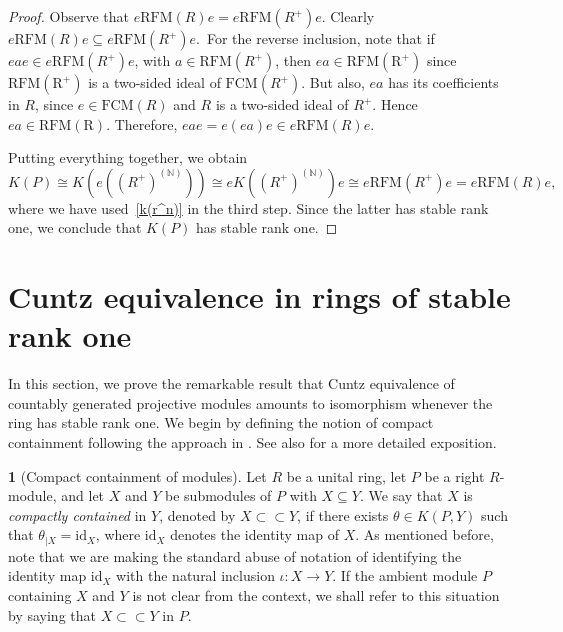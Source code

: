 \documentclass[11pt]{amsart}
\numberwithin{equation}{section}
\theoremstyle{definition}
\newtheorem{pgr}[pgrCt]{}
\newtheorem{dfn}[dfnCt]{Definition}
\theoremstyle{plain}
\theoremstyle{definition}
\begin{document}
\begin{proof}
Observe that $e\mathrm{RFM}(R)e = e\mathrm{RFM}(R^+)e$. Clearly $e\mathrm{RFM}(R)e \subseteq e\mathrm{RFM}(R^+)e$.~For the reverse inclusion, note that if $eae \in e\mathrm{RFM}(R^+)e$, with $a \in \mathrm{RFM}(R^+)$, then $ea \in \mathrm{RFM(R^+)}$ since $\mathrm{RFM(R^+)}$ is a two-sided ideal of $\mathrm{FCM}(R^+)$. But also, $ea$ has its coefficients in $R$, since $e \in \mathrm{FCM}(R)$ and $R$ is a two-sided ideal of $R^+$. Hence $ea \in \mathrm{RFM(R)}$. Therefore, $eae = e(ea)e \in e\mathrm{RFM}(R)e$. 

Putting everything together, we obtain
\begin{equation*}
    K(P) \cong K(e((R^+)^{(\mathbb{N})})) \cong eK((R^+)^{(\mathbb{N})})e \cong e\mathrm{RFM}(R^+)e = e\mathrm{RFM}(R)e,
\end{equation*}
where we have used~\autoref{k(r^n)} in the third step. Since the latter has stable rank one, we conclude that $K(P)$ has stable rank one. 
\end{proof}

\section{Cuntz equivalence in rings of stable rank one}

In this section, we prove the remarkable result that Cuntz equivalence of countably generated projective modules amounts to isomorphism whenever the ring has stable rank one. We begin by defining the notion of compact containment following the approach in \cite{CowEllIva08CuInv}. See also \cite[4.4]{AraPerTom11Cu} for a more detailed exposition.  

\begin{pgr}[Compact containment of modules]
Let $R$ be a unital ring, let $P$ be a right $R$-module, and let $X$ and $Y$ be submodules of $P$ with $X \subseteq Y$. We say that $X$ is \emph{compactly contained} in $Y$, denoted by $X \subset\!\subset Y$, if there exists $\theta \in K(P, Y)$ such that $\theta_{|X} = \mathrm{id}_{X}$, where $\mathrm{id}_X$ denotes the identity map of $X$. As mentioned before, note that we are making the standard abuse of notation of identifying the identity map $\mathrm{id}_X$ with the natural inclusion $\iota \colon X \rightarrow Y$. If the ambient module $P$ containing $X$ and $Y$ is not clear from the context, we shall refer to this situation by saying that $X \subset\!\subset Y$ in $P$.
\end{pgr}
\end{document}
